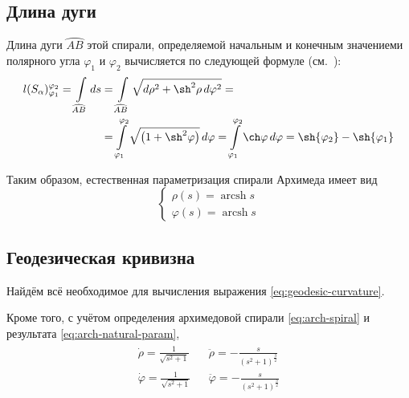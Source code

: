 \documentclass{article}
\numberwithin{equation}{section}
\renewcommand{\phi}{\varphi}
\DeclareMathOperator{\arcsh}{arcsh}
\providecommand{\arc}[1]{\wideparen{#1}}
\begin{document}
\subsection{Длина дуги}

Длина дуги $\arc{AB}$ этой спирали, определяемой начальным и конечным значениеми
полярного угла $\phi_1$ и $\phi_2$ вычисляется по следующей формуле
(см. \cite{dubrovin98}):
\begin{equation}\label{eq:arch-length}
  \begin{split}
    l(S_\alpha)^{\phi_2}_{\phi_1} =
    \int \limits_{\arc{AB}}{ds} &=
    \int \limits_{\arc{AB}}{\sqrt{d\rho^2+\sh^2\rho\,d\phi^2}} =\\
    &=\int \limits^{\phi_2}_{\phi_1}{\sqrt{\left ( 1 + \sh^2\phi \right )}}\,d\phi =
    \int \limits^{\phi_2}_{\phi_1}\ch\phi\,d\phi =
    \sh{\phi_2} - \sh{\phi_1}
  \end{split}
\end{equation}

Таким образом, естественная параметризация спирали Архимеда имеет вид
\begin{equation}\label{eq:arch-natural-param}
  \begin{cases}
    \rho(s) = \arcsh{s} \\
    \phi(s) = \arcsh{s}
  \end{cases}
\end{equation}

\subsection{Геодезическая кривизна}

Найдём всё необходимое для вычисления выражения
\eqref{eq:geodesic-curvature}.

Кроме того, с учётом определения архимедовой спирали
\eqref{eq:arch-spiral} и результата \eqref{eq:arch-natural-param},
\begin{gather}
  \begin{align*}
    \dot{\rho} = \frac{1}{\sqrt{s^2+1}} && \ddot{\rho} = -\frac{s}{(s^2+1)^{\frac{3}{2}}}\\
    \dot{\phi} = \frac{1}{\sqrt{s^2+1}} && \ddot{\phi} = -\frac{s}{(s^2+1)^{\frac{3}{2}}}
  \end{align*}
\end{gather}
\end{document}

